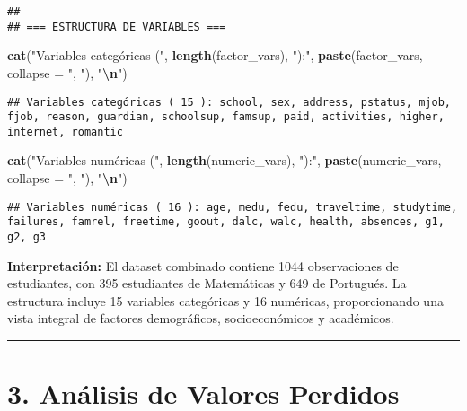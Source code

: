 \documentclass[
]{book}
\newenvironment{Shaded}{\begin{snugshade}}{\end{snugshade}}
\newcommand{\AttributeTok}[1]{\textcolor[rgb]{0.13,0.29,0.53}{#1}}
\newcommand{\FunctionTok}[1]{\textcolor[rgb]{0.13,0.29,0.53}{\textbf{#1}}}
\newcommand{\NormalTok}[1]{#1}
\newcommand{\SpecialCharTok}[1]{\textcolor[rgb]{0.81,0.36,0.00}{\textbf{#1}}}
\newcommand{\StringTok}[1]{\textcolor[rgb]{0.31,0.60,0.02}{#1}}
\begin{document}
\begin{verbatim}
## 
## === ESTRUCTURA DE VARIABLES ===
\end{verbatim}

\begin{Shaded}
\begin{Highlighting}[]
\FunctionTok{cat}\NormalTok{(}\StringTok{"Variables categóricas ("}\NormalTok{, }\FunctionTok{length}\NormalTok{(factor\_vars), }\StringTok{"):"}\NormalTok{, }\FunctionTok{paste}\NormalTok{(factor\_vars, }\AttributeTok{collapse =} \StringTok{", "}\NormalTok{), }\StringTok{"}\SpecialCharTok{\textbackslash{}n}\StringTok{"}\NormalTok{)}
\end{Highlighting}
\end{Shaded}

\begin{verbatim}
## Variables categóricas ( 15 ): school, sex, address, pstatus, mjob, fjob, reason, guardian, schoolsup, famsup, paid, activities, higher, internet, romantic
\end{verbatim}

\begin{Shaded}
\begin{Highlighting}[]
\FunctionTok{cat}\NormalTok{(}\StringTok{"Variables numéricas ("}\NormalTok{, }\FunctionTok{length}\NormalTok{(numeric\_vars), }\StringTok{"):"}\NormalTok{, }\FunctionTok{paste}\NormalTok{(numeric\_vars, }\AttributeTok{collapse =} \StringTok{", "}\NormalTok{), }\StringTok{"}\SpecialCharTok{\textbackslash{}n}\StringTok{"}\NormalTok{)}
\end{Highlighting}
\end{Shaded}

\begin{verbatim}
## Variables numéricas ( 16 ): age, medu, fedu, traveltime, studytime, failures, famrel, freetime, goout, dalc, walc, health, absences, g1, g2, g3
\end{verbatim}

\textbf{Interpretación:} El dataset combinado contiene 1044 observaciones de estudiantes, con 395 estudiantes de Matemáticas y 649 de Portugués. La estructura incluye 15 variables categóricas y 16 numéricas, proporcionando una vista integral de factores demográficos, socioeconómicos y académicos.

\begin{center}\rule{0.5\linewidth}{0.5pt}\end{center}

\section{3. Análisis de Valores Perdidos}\label{anuxe1lisis-de-valores-perdidos}
\end{document}
